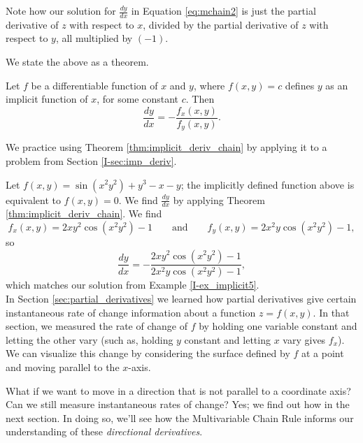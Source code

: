 Note how our solution for $\frac{dy}{dx}$ in Equation \eqref{eq:mchain2} is just the partial derivative of $z$ with respect to $x$, divided by the partial derivative of $z$ with respect to $y$, all multiplied by $(-1)$.

We state the above as a theorem.

{Let $f$ be a differentiable function of $x$ and $y$, where $f(x,y)=c$ defines $y$ as  an implicit function of $x$, for some constant $c$. Then
\[
\frac{dy}{dx} = - \frac{f_x(x,y)}{f_y(x,y)}.
\]
}

We practice using Theorem \ref{thm:implicit_deriv_chain} by applying it to a problem from Section \ref{I-sec:imp_deriv}.\pagebreak

{Let $f(x,y) = \sin(x^2y^2)+y^3-x-y$; the implicitly defined function above is equivalent to $f(x,y)=0$. We find $\frac{dy}{dx}$ by applying Theorem \ref{thm:implicit_deriv_chain}. We find 
\[
f_x(x,y) = 2xy^2\cos(x^2y^2)-1\qquad \text{and}\qquad f_y(x,y) = 2x^2y\cos(x^2y^2)-1,
\]
so 
\[
\frac{dy}{dx} = -\frac{2xy^2\cos(x^2y^2)-1}{2x^2y\cos(x^2y^2)-1},
\]
which matches our solution from Example \ref{I-ex_implicit5}.
}\\

In Section \ref{sec:partial_derivatives} we learned how partial derivatives give certain instantaneous rate of change information about a function $z=f(x,y)$. In that section, we measured the rate of change of $f$ by holding one variable constant and letting the other vary (such as, holding $y$ constant and letting $x$ vary gives $f_x$). We can visualize this change by considering the surface defined by $f$ at a point and moving parallel to the $x$-axis.

What if we want to move in a direction that is not parallel to a coordinate axis? Can we still measure instantaneous rates of change? Yes; we find out how in the next section. In doing so, we'll see how the Multivariable Chain Rule informs our understanding of these \emph{directional derivatives}.


